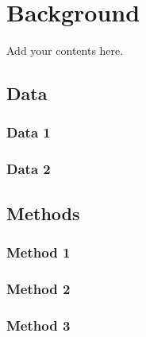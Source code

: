 \newpage
\chapter{Background}
\label{dm}

\setcounter{figure}{0}
\setcounter{table}{0}
\setcounter{equation}{0}

Add your contents here.

\section{Data}

\subsection{Data 1}

\subsection{Data 2}

\section{Methods}

\subsection{Method 1}

\subsection{Method 2}

\subsection{Method 3}

